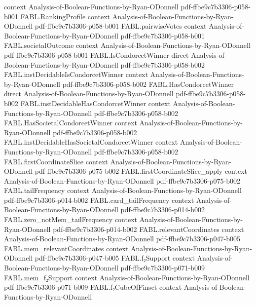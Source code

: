 \begin{theorem}
  {context}
  {Analysis-of-Boolean-Functions-by-Ryan-ODonnell}
  {pdf-ffbe9c7b3306-p058-b001}
\proofstep
  {FABL.RankingProfile}
  {context}
  {Analysis-of-Boolean-Functions-by-Ryan-ODonnell}
  {pdf-ffbe9c7b3306-p058-b001}
\proofstep
  {FABL.pairwiseVotes}
  {context}
  {Analysis-of-Boolean-Functions-by-Ryan-ODonnell}
  {pdf-ffbe9c7b3306-p058-b001}
\proofstep
  {FABL.societalOutcome}
  {context}
  {Analysis-of-Boolean-Functions-by-Ryan-ODonnell}
  {pdf-ffbe9c7b3306-p058-b001}
\proofstep
  {FABL.IsCondorcetWinner}
  {direct}
  {Analysis-of-Boolean-Functions-by-Ryan-ODonnell}
  {pdf-ffbe9c7b3306-p058-b002}
\proofstep
  {FABL.instDecidableIsCondorcetWinner}
  {context}
  {Analysis-of-Boolean-Functions-by-Ryan-ODonnell}
  {pdf-ffbe9c7b3306-p058-b002}
\proofstep
  {FABL.HasCondorcetWinner}
  {direct}
  {Analysis-of-Boolean-Functions-by-Ryan-ODonnell}
  {pdf-ffbe9c7b3306-p058-b002}
\proofstep
  {FABL.instDecidableHasCondorcetWinner}
  {context}
  {Analysis-of-Boolean-Functions-by-Ryan-ODonnell}
  {pdf-ffbe9c7b3306-p058-b002}
\proofstep
  {FABL.HasSocietalCondorcetWinner}
  {context}
  {Analysis-of-Boolean-Functions-by-Ryan-ODonnell}
  {pdf-ffbe9c7b3306-p058-b002}
\proofstep
  {FABL.instDecidableHasSocietalCondorcetWinner}
  {context}
  {Analysis-of-Boolean-Functions-by-Ryan-ODonnell}
  {pdf-ffbe9c7b3306-p058-b002}
\proofstep
  {FABL.firstCoordinateSlice}
  {context}
  {Analysis-of-Boolean-Functions-by-Ryan-ODonnell}
  {pdf-ffbe9c7b3306-p075-b002}
\proofstep
  {FABL.firstCoordinateSlice_apply}
  {context}
  {Analysis-of-Boolean-Functions-by-Ryan-ODonnell}
  {pdf-ffbe9c7b3306-p075-b002}
\proofstep
  {FABL.tailFrequency}
  {context}
  {Analysis-of-Boolean-Functions-by-Ryan-ODonnell}
  {pdf-ffbe9c7b3306-p014-b002}
\proofstep
  {FABL.card_tailFrequency}
  {context}
  {Analysis-of-Boolean-Functions-by-Ryan-ODonnell}
  {pdf-ffbe9c7b3306-p014-b002}
\proofstep
  {FABL.zero_notMem_tailFrequency}
  {context}
  {Analysis-of-Boolean-Functions-by-Ryan-ODonnell}
  {pdf-ffbe9c7b3306-p014-b002}
\proofstep
  {FABL.relevantCoordinates}
  {context}
  {Analysis-of-Boolean-Functions-by-Ryan-ODonnell}
  {pdf-ffbe9c7b3306-p047-b005}
\proofstep
  {FABL.mem_relevantCoordinates}
  {context}
  {Analysis-of-Boolean-Functions-by-Ryan-ODonnell}
  {pdf-ffbe9c7b3306-p047-b005}
\proofstep
  {FABL.f₂Support}
  {context}
  {Analysis-of-Boolean-Functions-by-Ryan-ODonnell}
  {pdf-ffbe9c7b3306-p071-b009}
\proofstep
  {FABL.mem_f₂Support}
  {context}
  {Analysis-of-Boolean-Functions-by-Ryan-ODonnell}
  {pdf-ffbe9c7b3306-p071-b009}
\proofstep
  {FABL.f₂CubeOfFinset}
  {context}
  {Analysis-of-Boolean-Functions-by-Ryan-ODonnell}

\end{theorem}
